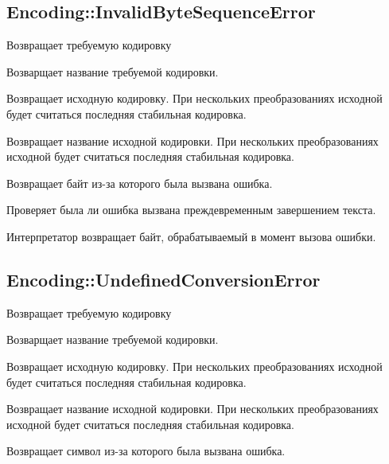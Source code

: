 \subsection*{Encoding::InvalidByteSequenceError}

\begin{methodlist}
  Возвращает требуемую кодировку 
 
  Возварщает название требуемой кодировки.

  Возвращает исходную кодировку. При нескольких преобразованиях исходной будет считаться последняя стабильная кодировка. 
 
  Возвращает название исходной кодировки. При нескольких преобразованиях исходной будет считаться последняя стабильная кодировка.

  Возвращает байт из-за которого была вызвана ошибка. 

  Проверяет была ли ошибка вызвана преждевременным завершением текста. 
 
  Интерпретатор возвращает байт, обрабатываемый в момент вызова ошибки.
\end{methodlist}

\subsection*{Encoding::UndefinedConversionError}

\begin{methodlist}
  Возвращает требуемую кодировку 
 
  Возварщает название требуемой кодировки.

  Возвращает исходную кодировку. При нескольких преобразованиях исходной будет считаться последняя стабильная кодировка. 
 
  Возвращает название исходной кодировки. При нескольких преобразованиях исходной будет считаться последняя стабильная кодировка.

  Возвращает символ из-за которого была вызвана ошибка. 
\end{methodlist}

